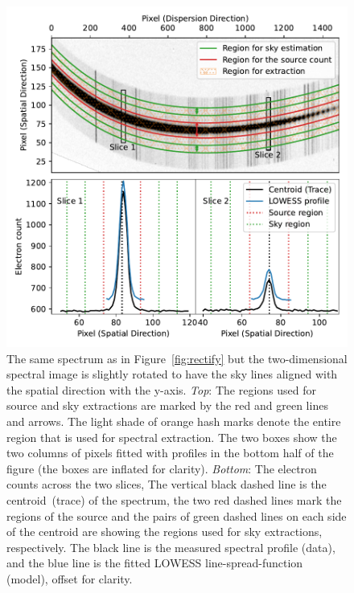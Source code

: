\documentclass[linenumbers, twocolumn]{aastex631}
\begin{document}
\begin{figure}
    \centering
    \includegraphics[width=\columnwidth]{fig_03_extraction_profile.pdf}
    \caption{The same spectrum as in Figure~\ref{fig:rectify} but the
    two-dimensional spectral image is slightly rotated to have the sky lines
    aligned with the spatial direction with the y-axis.
    \textit{Top}: The regions used for source and sky extractions are marked
    by the red and green lines and arrows. The light shade of orange
    hash marks denote the entire region that is used for spectral extraction.
    The two boxes show the two columns of pixels fitted with
    profiles in the bottom half of the figure (the boxes are inflated
    for clarity). \textit{Bottom}: The electron counts across the two slices,
    The vertical black dashed line is the centroid~(trace) of the spectrum,
    the two red dashed lines mark the regions of the source and the
    pairs of green dashed lines on each side of the centroid are
    showing the regions used for sky extractions, respectively. The
    black line is the measured spectral profile (data), and the blue
    line is the fitted LOWESS line-spread-function (model), offset for
    clarity.}
    \label{fig:extraction}
\end{figure}

\end{document}
